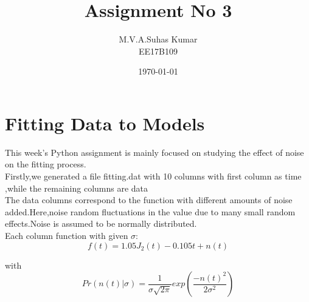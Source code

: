 \documentclass[11pt, a4paper]{article}
\title{Assignment No 3} %
\author{M.V.A.Suhas Kumar \\ {\small EE17B109}}
\date{\today} %
\begin{document}
		
		
\maketitle %
\section{Fitting Data to Models}
This week’s Python assignment is mainly focused on studying the effect of noise on the fitting process.\\
Firstly,we generated a file fitting.dat with 10 columns with first column as time ,while the remaining columns are data\\
The data columns correspond to the function with different amounts of noise added.Here,noise random fluctuations in the value due to many small random effects.Noise is assumed to be normally distributed.\\

Each column function with given $\sigma$:\\
\begin{equation*}
f(t) = 1.05J_{2}(t) - 0.105t + n(t)
\end{equation*}

with \begin{equation*}
Pr(n(t)|\sigma) = \frac{1}{\sigma\sqrt{2\pi}}exp(\frac{-n(t)^2}{2\sigma^2})
\end{equation*}
\end{document}

